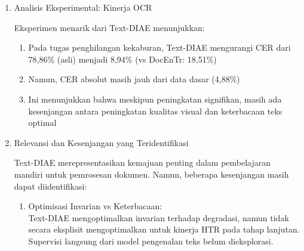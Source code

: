\documentclass[12pt,a4paper]{article}
\begin{document}
\begin{enumerate}[leftmargin=*, labelsep=0.5em, itemindent=0pt, label=\arabic*., topsep=0pt, partopsep=0pt]
\begin{enumerate}[leftmargin=1.5em, labelsep=0.5em, itemindent=0pt, label=\alph*., topsep=0pt, parsep=0pt, itemsep=0pt]
      \item Keterbatasan Degradasi Sintetis: \mbox{}\\[0.1em]
            Prapelatihan menggunakan degradasi sintetis (penutupan, kekaburan, derau) yang mungkin tidak menangkap karakteristik kompleks dari degradasi alami dokumen historis seperti tembusan, bercak cokelat, atau degradasi kimia.

      \item Ketiadaan Pelatihan Adversarial: \mbox{}\\[0.1em]
            Tanpa komponen adversarial, Text-DIAE cenderung menghasilkan keluaran yang terlalu halus. Hal ini terlihat dari perbandingan kualitatif dengan DocEnTr, yaitu Text-DIAE menghasilkan tekstur yang kurang realistis.

      \item Kompleksitas Komputasi: \mbox{}\\[0.1em]
            Kompleksitas kuadratik dari mekanisme \textit{self-attention} membuatnya kurang praktis untuk dokumen historis beresolusi tinggi yang umum dalam arsip.
\end{enumerate}

\item Analisis Eksperimental: Kinerja OCR

Eksperimen menarik dari Text-DIAE menunjukkan:
\begin{enumerate}[leftmargin=1.5em, labelsep=0.5em, itemindent=0pt, label=\alph*., topsep=0pt, parsep=0pt, itemsep=0pt]
      \item Pada tugas penghilangan kekaburan, Text-DIAE mengurangi CER dari 78,86\% (asli) menjadi 8,94\% (vs DocEnTr: 18,51\%)
      \item Namun, CER absolut masih jauh dari data dasar (4,88\%)
      \item Ini menunjukkan bahwa meskipun peningkatan signifikan, masih ada kesenjangan antara peningkatan kualitas visual dan keterbacaan teks optimal
\end{enumerate}

\item Relevansi dan Kesenjangan yang Teridentifikasi
\label{para:textdiae-kesenjangan}

Text-DIAE merepresentasikan kemajuan penting dalam pembelajaran mandiri untuk pemrosesan dokumen. Namun, beberapa kesenjangan masih dapat diidentifikasi:

\begin{enumerate}[leftmargin=1.5em, labelsep=0.5em, itemindent=0pt, label=\alph*., topsep=0pt, parsep=0pt, itemsep=0pt]
      \item Optimisasi Invarian vs Keterbacaan: \mbox{}\\[0.1em]
            Text-DIAE mengoptimalkan invarian terhadap degradasi, namun tidak secara eksplisit mengoptimalkan untuk kinerja HTR pada tahap lanjutan. Supervisi langsung dari model pengenalan teks belum dieksplorasi.


\end{enumerate}
\end{enumerate}
\end{document}
